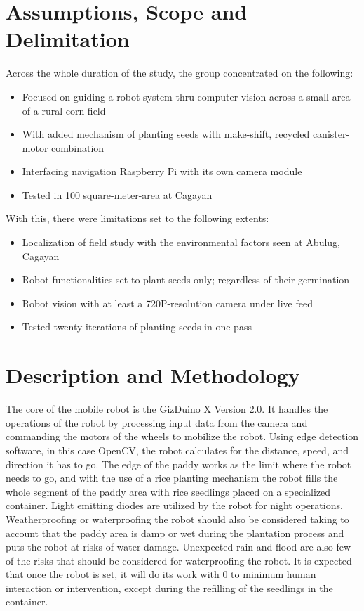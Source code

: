 \section{Assumptions, Scope and Delimitation}
Across the whole duration of the study, the group concentrated on the following:
\begin{itemize}
\item Focused on guiding a robot system thru computer vision across a small-area of a rural corn field
\item With added mechanism of planting seeds with make-shift, recycled canister-motor combination
\item Interfacing navigation Raspberry Pi with its own camera module
\item Tested in 100 square-meter-area at Cagayan
\end{itemize}
 
With this, there were limitations set to the following extents:
\begin{itemize}
\item Localization of field study with the environmental factors seen at Abulug, Cagayan
\item Robot functionalities set to plant seeds only; regardless of their germination
\item Robot vision with at least a 720P-resolution camera under live feed
\item Tested twenty iterations of planting seeds in one pass
\end{itemize}

\section{Description and Methodology}

	The core of the mobile robot is the GizDuino X Version 2.0. It handles the operations of the robot by processing input data from the camera and commanding the motors of the wheels to mobilize the robot. Using edge detection software, in this case OpenCV, the robot calculates for the distance, speed, and direction it has to go. The edge of the paddy works as the limit where the robot needs to go, and with the use of a rice planting mechanism the robot fills the whole segment of the paddy area with rice seedlings placed on a specialized container. Light emitting diodes are utilized by the robot for night operations. Weatherproofing or waterproofing the robot should also be considered taking to account that the paddy area is damp or wet during the plantation process and puts the robot at risks of water damage. Unexpected rain and flood are also few of the risks that should be considered for waterproofing the robot. It is expected that once the robot is set, it will do its work with 0 to minimum human interaction or intervention, except during the refilling of the seedlings in the container. 
 
